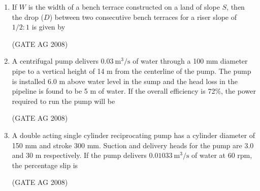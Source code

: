 \documentclass[journal,12pt,onecolumn]{IEEEtran}
\begin{document}
\begin{enumerate}
\medskip

\item 
 If $W$ is the width of a bench terrace constructed on a land of slope $S$, then the drop ($D$) between two consecutive bench terraces for a riser slope of $1/2 : 1$ is given by
\begin{enumerate}
\end{enumerate}
\hfill(GATE AG 2008)\\

\medskip

\item 
 A centrifugal pump delivers $0.03\ \text{m}^3/\text{s}$ of water through a 100 mm diameter pipe to a vertical height of 14 m from the centerline of the pump. The pump is installed 6.0 m above water level in the sump and the head loss in the pipeline is found to be 5 m of water. If the overall efficiency is 72\%, the power required to run the pump will be
\begin{enumerate}
\end{enumerate}
\hfill(GATE AG 2008)\\

\medskip

\item 
 A double acting single cylinder reciprocating pump has a cylinder diameter of 150 mm and stroke 300 mm. Suction and delivery heads for the pump are 3.0 and 30 m respectively. If the pump delivers $0.01033\ \text{m}^3/\text{s}$ of water at 60 rpm, the percentage slip is
\begin{enumerate}
\end{enumerate}
\hfill(GATE AG 2008)\\


\end{enumerate}
\end{document}
